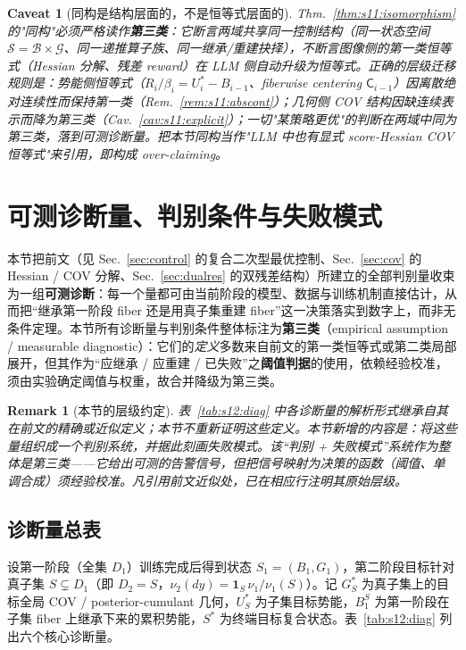 \documentclass[11pt,a4paper]{article}
\newtheorem{remark}[theorem]{Remark}
\newtheorem{caveat}[theorem]{Caveat}
\newcommand{\cS}{\mathcal{S}}   %
\newcommand{\cG}{\mathcal{G}}   %
\newcommand{\cB}{\mathcal{B}}   %
\newcommand{\Center}{\mathsf{C}}    %
\begin{document}
\begin{caveat}[同构是结构层面的，不是恒等式层面的]\label{cav:s11:tier}
Thm.~\ref{thm:s11:isomorphism} 的"同构"必须严格读作\textbf{第三类}：它断言两域共享同一控制结构（同一状态空间 $\cS=\cB\times\cG$、同一递推算子族、同一继承/重建抉择），\emph{不}断言图像侧的第一类恒等式（Hessian 分解、残差 reward）在 LLM 侧自动升级为恒等式。正确的层级迁移规则是：势能侧恒等式（$R_i/\beta_i=U_i^*-B_{i-1}$、fiberwise centering $\Center_{i-1}$）因离散绝对连续性而\emph{保持第一类}（Rem.~\ref{rem:s11:abscont}）；几何侧 COV 结构因缺连续表示而\emph{降为第三类}（Cav.~\ref{cav:s11:explicit}）；一切"某策略更优"的判断在两域中\emph{同为第三类}，落到可测诊断量。把本节同构当作"LLM 中也有显式 score-Hessian COV 恒等式"来引用，即构成 over-claiming。
\end{caveat}

\section{可测诊断量、判别条件与失败模式}\label{sec:diagnostics}

本节把前文（见 Sec.~\ref{sec:control} 的复合二次型最优控制、Sec.~\ref{sec:cov} 的 Hessian / COV 分解、Sec.~\ref{sec:dualres} 的双残差结构）所建立的全部判别量收束为一组\textbf{可测诊断}：每一个量都可由当前阶段的模型、数据与训练机制直接估计，从而把“继承第一阶段 fiber 还是用真子集重建 fiber”这一决策落实到数字上，而非无条件定理。本节所有诊断量与判别条件整体标注为\textbf{第三类}（empirical assumption / measurable diagnostic）：它们的\emph{定义}多数来自前文的第一类恒等式或第二类局部展开，但其作为“应继承 / 应重建 / 已失败”之\textbf{阈值判据}的使用，依赖经验校准，须由实验确定阈值与权重，故合并降级为第三类。

\begin{remark}[本节的层级约定]\label{rem:s12:tier}
表~\ref{tab:s12:diag} 中各诊断量的解析形式继承自其在前文的精确或近似定义；本节不重新证明这些定义。本节新增的内容是：将这些量组织成一个判别系统，并据此刻画失败模式。该“判别 + 失败模式”系统作为整体是第三类——它给出\emph{可测}的告警信号，但把信号映射为决策的函数（阈值、单调合成）须经验校准。凡引用前文近似处，已在相应行注明其原始层级。
\end{remark}

\subsection{诊断量总表}\label{ssec:s12:table}

设第一阶段（全集 $D_1$）训练完成后得到状态 $S_1=(B_1,G_1)$，第二阶段目标针对真子集 $S\subsetneq D_1$（即 $D_2=S$，$\nu_2(dy)=\mathbf{1}_S\,\nu_1/\nu_1(S)$）。记 $G_S^*$ 为真子集上的目标全局 COV / posterior-cumulant 几何，$U_S^*$ 为子集目标势能，$B_1^S$ 为第一阶段在子集 fiber 上继承下来的累积势能，$S^*$ 为终端目标复合状态。表~\ref{tab:s12:diag} 列出六个核心诊断量。
\end{document}

